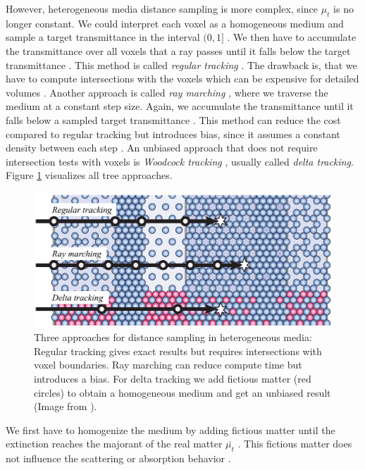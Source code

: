 However, heterogeneous media distance sampling is more complex, since $\mu_t$ is no longer constant.
We could interpret each voxel as a homogeneous medium and sample a target transmittance in the interval $(0, 1]$ \cite{novak_overview}.
We then have to accumulate the transmittance over all voxels that a ray passes until it falls below the target transmittance \cite{novak_overview}.
This method is called \textit{regular tracking} \cite{sutton_regular_tracking}.
The drawback is, that we have to compute intersections with the voxels which can be expensive for detailed volumes \cite{novak_overview}.
Another approach is called \textit{ray marching} \cite{perlin_hypertexture}, where we traverse the medium at a constant step size.
Again, we accumulate the transmittance until it falls below a sampled target transmittance \cite{novak_overview}.
This method can reduce the cost compared to regular tracking but introduces bias, since it assumes a constant density between each step \cite{novak_overview}.
An unbiased approach that does not require intersection tests with voxels is \textit{Woodcock tracking} \cite{woodcock}, usually called \textit{delta tracking}.
Figure \ref{fig:novak_distance_sampling} visualizes all tree approaches.
\begin{figure}[ht]
    \centering
    \includegraphics[width=0.7\linewidth]{img/novak_distance_sampling.png}
    \caption[Approaches for distance sampling in heterogeneous media]{Three approaches for distance sampling in heterogeneous media: Regular tracking gives exact results but requires intersections with voxel boundaries. Ray marching can reduce compute time but introduces a bias. For delta tracking we add fictious matter (red circles) to obtain a homogeneous medium and get an unbiased result (Image from \cite{novak_overview}).}
    \label{fig:novak_distance_sampling}
\end{figure}
We first have to homogenize the medium by adding fictious matter until the extinction reaches the majorant of the real matter $\bar{\mu_t}$ \cite{novak_overview}.
This fictious matter does not influence the scattering or absorption behavior \cite{novak_overview}.
